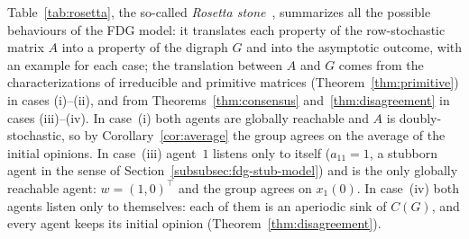 Table~\ref{tab:rosetta}, the so-called \emph{Rosetta stone}~\cite{baggio_dt},
summarizes all the possible behaviours of the FDG model: it translates each property
of the row-stochastic matrix $A$ into a property of the digraph $G$ and into the
asymptotic outcome, with an example for each case; the translation between $A$ and $G$
comes from the characterizations of irreducible and primitive matrices
(Theorem~\ref{thm:primitive}) in cases (i)--(ii),
and from Theorems~\ref{thm:consensus} and~\ref{thm:disagreement} in cases
(iii)--(iv). In case~(i) both agents are
globally reachable and $A$ is doubly-stochastic, so by Corollary~\ref{cor:average} the
group agrees on the average of the initial opinions. In case~(iii) agent~$1$ listens
only to itself ($a_{11} = 1$, a stubborn agent in the sense of
Section~\ref{subsubsec:fdg-stub-model}) and is the only globally reachable agent:
$w = (1, 0)^\top$ and the group agrees on $x_1(0)$. In case~(iv) both agents listen only
to themselves: each of them is an aperiodic sink of $C(G)$, and every agent keeps its
initial opinion (Theorem~\ref{thm:disagreement}).
%
%

